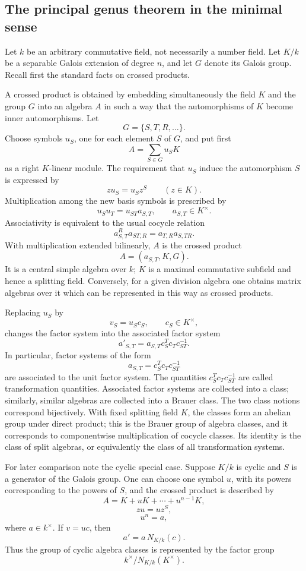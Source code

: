 \documentclass[12pt]{article}
\begin{document}
\subsection{The principal genus theorem in the minimal sense}

Let \(k\) be an arbitrary commutative field, not necessarily a number field. Let \(K/k\) be a separable Galois extension of degree \(n\), and let \(G\) denote its Galois group. Recall first the standard facts on crossed products.

A crossed product is obtained by embedding simultaneously the field \(K\) and the group \(G\) into an algebra \(A\) in such a way that the automorphisms of \(K\) become inner automorphisms. Let
\[
  G=\{S,T,R,\ldots\}.
\]
Choose symbols \(u_S\), one for each element \(S\) of \(G\), and put first
\[
  A=\sum_{S\in G} u_S K
\]
as a right \(K\)-linear module. The requirement that \(u_S\) induce the automorphism \(S\) is expressed by
\[
  z u_S = u_S z^S\qquad(z\in K).
\]
Multiplication among the new basis symbols is prescribed by
\[
  u_S u_T = u_{ST} a_{S,T},\qquad a_{S,T}\in K^{\times} .
\]
Associativity is equivalent to the usual cocycle relation
\[
  a_{S,T}^{R} a_{ST,R}=a_{T,R}a_{S,TR}.
\]
With multiplication extended bilinearly, \(A\) is the crossed product
\[
  A=(a_{S,T},K,G).
\]
It is a central simple algebra over \(k\); \(K\) is a maximal commutative subfield and hence a splitting field. Conversely, for a given division algebra one obtains matrix algebras over it which can be represented in this way as crossed products.

Replacing \(u_S\) by
\[
  v_S=u_S c_S,\qquad c_S\in K^{\times},
\]
changes the factor system into the associated factor system
\[
  a'_{S,T}=a_{S,T}c_S^T c_T c_{ST}^{-1}.
\]
In particular, factor systems of the form
\[
  a_{S,T}=c_S^T c_T c_{ST}^{-1}
\]
are associated to the unit factor system. The quantities \(c_S^T c_T c_{ST}^{-1}\) are called transformation quantities. Associated factor systems are collected into a class; similarly, similar algebras are collected into a Brauer class. The two class notions correspond bijectively. With fixed splitting field \(K\), the classes form an abelian group under direct product; this is the Brauer group of algebra classes, and it corresponds to componentwise multiplication of cocycle classes. Its identity is the class of split algebras, or equivalently the class of all transformation systems.

For later comparison note the cyclic special case. Suppose \(K/k\) is cyclic and \(S\) is a generator of the Galois group. One can choose one symbol \(u\), with its powers corresponding to the powers of \(S\), and the crossed product is described by
\[
  A=K+uK+\cdots+u^{n-1}K,
\]
\[
  zu=uz^S,
\]
\[
  u^n=a,
\]
where \(a\in k^{\times}\). If \(v=uc\), then
\[
  a'=a\,N_{K/k}(c).
\]
Thus the group of cyclic algebra classes is represented by the factor group
\[
  k^{\times}/N_{K/k}(K^{\times}).
\]
\end{document}
